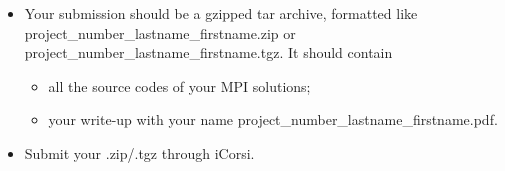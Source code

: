 \documentclass[unicode,11pt,a4paper,oneside,numbers=endperiod,openany]{scrartcl}
\begin{document}
\begin{itemize}
	\item Your submission should be a gzipped tar archive, formatted like project\_number\_lastname\_firstname.zip or project\_number\_lastname\_firstname.tgz. 
	It should contain
	\begin{itemize}
		\item all the source codes of your MPI solutions;
		\item your write-up with your name  project\_number\_lastname\_firstname.pdf.
	\end{itemize}
	\item Submit your .zip/.tgz through iCorsi.
\end{itemize}
\end{document}
